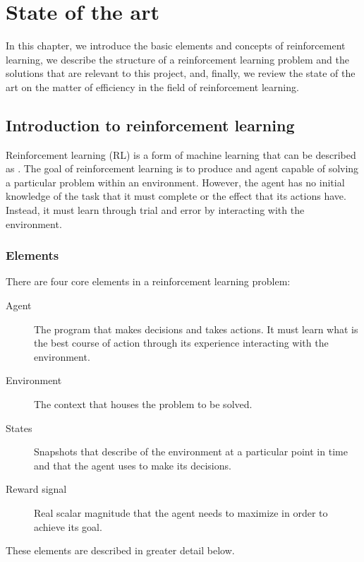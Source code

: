 \chapter{State of the art}
\label{chapter:state_of_the_art}

In this chapter, we introduce the basic elements and concepts of reinforcement learning, we describe the structure of a reinforcement learning problem and the solutions that are relevant to this project, and, finally, we review the state of the art on the matter of efficiency in the field of reinforcement learning.

\section{Introduction to reinforcement learning}

Reinforcement learning (RL) is a form of machine learning that can be described as  \cite{Kaelbling:1996}. The goal of reinforcement learning is to produce and agent capable of solving a particular problem within an environment. However, the agent has no initial knowledge of the task that it must complete or the effect that its actions have. Instead, it must learn through trial and error by interacting with the environment.

\subsection{Elements}

There are four core elements in a reinforcement learning problem:

\begin{description}
    \item[Agent] The program that makes decisions and takes actions. It must learn what is the best course of action through its experience interacting with the environment.
    \item[Environment] The context that houses the problem to be solved.
    \item[States] Snapshots that describe of the environment at a particular point in time and that the agent uses to make its decisions.
    \item[Reward signal] Real scalar magnitude that the agent needs to maximize in order to achieve its goal.
\end{description}

These elements are described in greater detail below.

